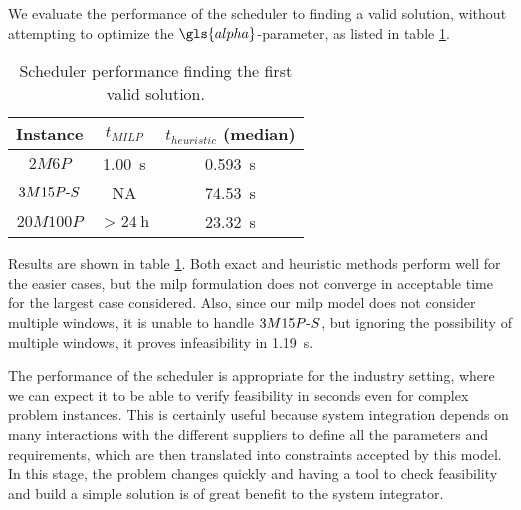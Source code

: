 \documentclass[main.tex]{subfiles}
\begin{document}
We evaluate the performance of the scheduler to finding a valid solution, without attempting to optimize the $\gls{alpha}$-parameter, as listed in table \ref{tab:feasibility-results}.
\begin{table}[htbp]
\centering
    \caption{Scheduler performance finding the first valid solution.}
    \label{tab:feasibility-results}
    \begin{tabular}{c c c}
        \toprule
        Instance           & $t_{MILP}$          & $t_{heuristic}$ (median) \\
        \midrule
        $2M6P$             & \SI{1.00}{\second}  & \SI{0.593}{\second} \\
        $3M15P\text{-} S$ & NA                  & \SI{74.53}{\second} \\
        $20M100P$          & $>\SI{24}{\hour}$   & \SI{23.32}{\second} \\
        \bottomrule
    \end{tabular}
\end{table}
Results are shown in table \ref{tab:feasibility-results}.
Both exact and heuristic methods perform well for the easier cases, but the \gls{milp} formulation does not converge in acceptable time for the largest case considered.
Also, since our \gls{milp} model does not consider multiple windows, it is unable to handle $3M15P\text{-} S$, but ignoring the possibility of multiple windows, it proves infeasibility in \SI{1.19}{\second}.

The performance of the scheduler is appropriate for the industry setting, where we can expect it to be able to verify feasibility in seconds even for complex problem instances.
This is certainly useful because system integration depends on many interactions with the different suppliers to define all the parameters and requirements, which are then translated into constraints accepted by this model.
In this stage, the problem changes quickly and having a tool to check feasibility and build a simple solution is of great benefit to the system integrator.
\end{document}
